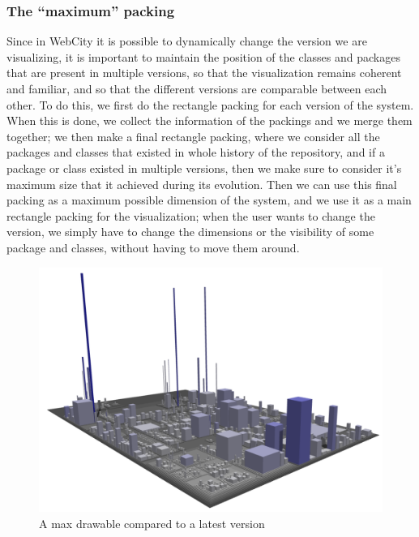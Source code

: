 \documentclass[]{usiinfbachelorproject}
\begin{document}
\subsubsection{The ``maximum'' packing} \label{The ``maximum'' packing}
Since in WebCity it is possible to dynamically change the version we are visualizing, it is important to maintain the position of the classes and packages that are present in multiple versions, so that the visualization remains coherent and familiar, and so that the different versions are comparable between each other.
To do this, we first do the rectangle packing for each version of the system. When this is done, we collect the information of the packings and we merge them together; we then make a final rectangle packing, where we consider all the packages and classes that existed in whole history of the repository, and if a package or class existed in multiple versions, then we make sure to consider it's maximum size that it achieved during its evolution.
Then we can use this final packing as a maximum possible dimension of the system, and we use it as a main rectangle packing for the visualization; when the user wants to change the version, we simply have to change the dimensions or the visibility of some package and classes, without having to move them around.

\begin{figure} [H]
\centering
\includegraphics[width=.5\textwidth]{pictures/example.png}
\caption{A max drawable compared to a latest version}
\label{fig:flow}
\end{figure}
\end{document}
